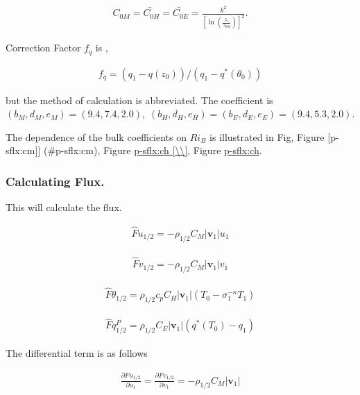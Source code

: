 \begin{eqnarray}
C_{0M}  =  \widetilde{C_{0H}}  =  \widetilde{C_{0E}}  = 
       \frac{k^2}{\left[\ln \left(\frac{z_1}{z_{0M}}\right)\right]^2 } .
\end{eqnarray}

Correction Factor \(f_q\) is ,

\begin{eqnarray}
  f_q = (q_1 - q(z_0))/(q_1 - q^{\ast}(\theta_0))
\end{eqnarray}

but the method of calculation is abbreviated. The coefficient is
\(( b_M, d_M, e_M ) = ( 9.4, 7.4, 2.0 ), \; ( b_H, d_H, e_H ) = ( b_E, d_E, e_E ) = ( 9.4, 5.3, 2.0 )\).

The dependence of the bulk coefficients on \(Ri_B\) is illustrated in
Fig, Figure {[}p-sflx:cm{]}{]} (\#p-sflx:cm), Figure
\protect\hyperlink{p-sflx:ch}{p-sflx:ch
{[}\textbackslash\textbackslash{]}}, Figure
\protect\hyperlink{p-sflx:ch}{p-sflx:ch}.

\hypertarget{calculating-flux.}{%
\subsubsection{Calculating Flux.}\label{calculating-flux.}}

This will calculate the flux.

\begin{eqnarray}
\hat{F}u_{1/2}  =  - \rho_{1/2} C_M |\mathbf{v}_1| u_1
\end{eqnarray}

\begin{eqnarray}
\hat{F}v_{1/2}  =  - \rho_{1/2} C_M |\mathbf{v}_1| v_1
\end{eqnarray}

\begin{eqnarray}
\hat{F}\theta_{1/2}  = \rho_{1/2} c_p C_H |\mathbf{v}_1| 
                    \left( T_0 - \sigma_1^{-\kappa} T_1 \right)
\end{eqnarray}

\begin{eqnarray}
\hat{F}q^P_{1/2}  =  \rho_{1/2} C_E |\mathbf{v}_1| 
                    \left( q^*(T_0) - q_1 \right)
\end{eqnarray}

The differential term is as follows

\begin{eqnarray}
\frac{\partial Fu_{1/2}}{\partial u_1} = \frac{\partial Fv_{1/2}}{\partial v_1} 
= - \rho_{1/2} C_M |\mathbf{v}_1|
\end{eqnarray}

